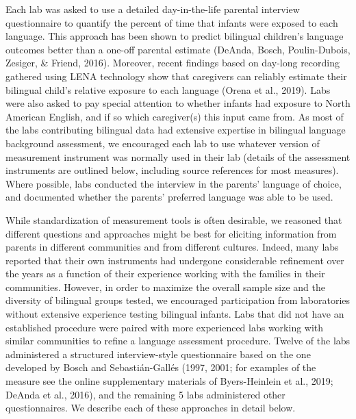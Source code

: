 \documentclass[english,,man,floatsintext]{apa6}
\begin{document}
Each lab was asked to use a detailed day-in-the-life parental interview questionnaire to quantify the percent of time that infants were exposed to each language. This approach has been shown to predict bilingual children's language outcomes better than a one-off parental estimate (DeAnda, Bosch, Poulin-Dubois, Zesiger, \& Friend, 2016). Moreover, recent findings based on day-long recording gathered using LENA technology show that caregivers can reliably estimate their bilingual child's relative exposure to each language (Orena et al., 2019). Labs were also asked to pay special attention to whether infants had exposure to North American English, and if so which caregiver(s) this input came from. As most of the labs contributing bilingual data had extensive expertise in bilingual language background assessment, we encouraged each lab to use whatever version of measurement instrument was normally used in their lab (details of the assessment instruments are outlined below, including source references for most measures). Where possible, labs conducted the interview in the parents' language of choice, and documented whether the parents' preferred language was able to be used.

While standardization of measurement tools is often desirable, we reasoned that different questions and approaches might be best for eliciting information from parents in different communities and from different cultures. Indeed, many labs reported that their own instruments had undergone considerable refinement over the years as a function of their experience working with the families in their communities. However, in order to maximize the overall sample size and the diversity of bilingual groups tested, we encouraged participation from laboratories without extensive experience testing bilingual infants. Labs that did not have an established procedure were paired with more experienced labs working with similar communities to refine a language assessment procedure. Twelve of the labs administered a structured interview-style questionnaire based on the one developed by Bosch and Sebastián-Gallés (1997, 2001; for examples of the measure see the online supplementary materials of Byers-Heinlein et al., 2019; DeAnda et al., 2016), and the remaining 5 labs administered other questionnaires. We describe each of these approaches in detail below.
\end{document}
